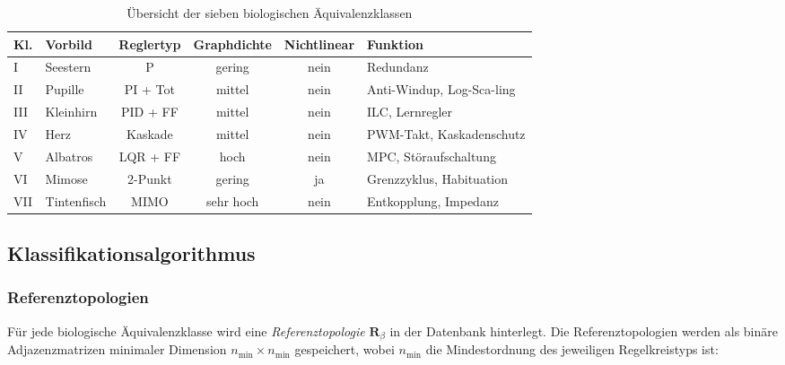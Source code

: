 \documentclass[a4paper,12pt]{article}
\theoremstyle{definition}
\begin{document}
\begin{table}[h]
	\centering
	\begin{tabular}{@{}llcccp{4cm}@{}}
		\toprule
		\textbf{Kl.} & \textbf{Vorbild} & \textbf{Reglertyp} & \textbf{Graphdichte} & \textbf{Nichtlinear} & \textbf{Funktion} \\
		\midrule
		I   & Seestern    & P        & gering   & nein & Redundanz \\
		II  & Pupille     & PI + Tot & mittel   & nein & Anti-Windup, Log-Sca\newline-ling \\
		III & Kleinhirn   & PID + FF & mittel   & nein & ILC, Lernregler \\
		IV  & Herz        & Kaskade  & mittel   & nein & PWM-Takt, Kaskadenschutz \\
		V   & Albatros    & LQR + FF & hoch     & nein & MPC, Störaufschaltung \\
		VI  & Mimose      & 2-Punkt  & gering   & ja   & Grenzzyklus, Habituation \\
		VII & Tintenfisch & MIMO     & sehr hoch& nein & Entkopplung, Impedanz \\
		\bottomrule
	\end{tabular}
	\caption{Übersicht der sieben biologischen Äquivalenzklassen}
	\label{tab:bio_klassen_uebersicht}
\end{table}

\subsection{Klassifikationsalgorithmus}
\label{subsec:bio_algorithmus}

\subsubsection{Referenztopologien}

Für jede biologische Äquivalenzklasse wird eine \emph{Referenztopologie}
$\mathbf{R}_\beta$ in der Datenbank hinterlegt. Die Referenztopologien
werden als binäre Adjazenzmatrizen minimaler Dimension $n_{\min} \times n_{\min}$
gespeichert, wobei $n_{\min}$ die Mindestordnung des jeweiligen Regelkreistyps ist:
\end{document}

